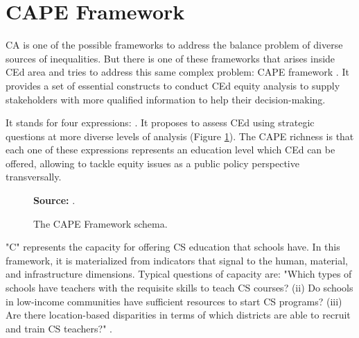 \section{CAPE Framework}
\label{equity-sec:cape}

\gls{CA} is one of the possible frameworks to address the balance problem of diverse sources of inequalities. But there is one of these frameworks that arises inside \gls{CEd} area and tries to address this same complex problem: \gls{CAPE} framework \cite{fletcher:2021}. It provides a set of essential constructs to conduct \gls{CEd} equity analysis to supply stakeholders with more qualified information to help their decision-making.

It stands for four expressions: . It proposes to assess \gls{CEd} using strategic questions at more diverse levels of analysis (Figure \ref{fig:cape-framework}). The \gls{CAPE} richness is that each one of these expressions represents an education level which \gls{CEd} can be offered, allowing to tackle equity issues as a public policy perspective transversally.

\begin{figure}[ht!]
\centering

\caption{\textmd{The \acrshort{CAPE} Framework schema.}}
\label{fig:cape-framework}

\par\medskip\ABNTEXfontereduzida\selectfont\textbf{Source:} .
\end{figure}

"C" represents the capacity for offering \gls{CS} education that schools have. In this framework, it is materialized from indicators that signal to the human, material, and infrastructure dimensions. Typical questions of capacity are: "Which types of schools have teachers with the requisite skills to teach \gls{CS} courses? (ii) Do schools in low-income communities have sufficient resources to start \gls{CS} programs? (iii) Are there location-based disparities in terms of which districts are able to recruit and train \gls{CS} teachers?" \cite[p.~4]{warner:2022}.

